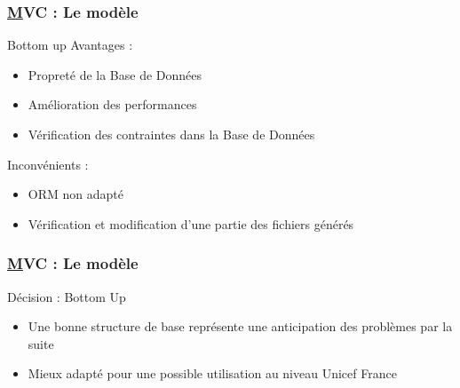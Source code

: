 \begin{frame}
	\frametitle{\underline{M}VC : Le modèle}
	\begin{block}{Bottom up}
	Avantages :
		\begin{itemize}
			\item Propreté de la Base de Données
			\item Amélioration des performances
			\item Vérification des contraintes dans la Base de Données
		\end{itemize} 
	Inconvénients :
		\begin{itemize}
			\item ORM non adapté
			\item Vérification et modification d'une partie des fichiers générés
		\end{itemize}
	\end{block}
  
\end{frame}


\begin{frame}
	\frametitle{\underline{M}VC : Le modèle}
	\begin{block}{Décision : Bottom Up}
		\begin{itemize}
		\item Une bonne structure de base représente une anticipation des problèmes par la suite 
		\item Mieux adapté pour une possible utilisation au niveau Unicef France
		\end{itemize}
		
		
	\end{block}
\end{frame}


